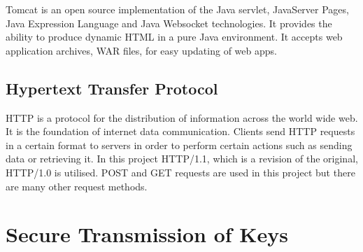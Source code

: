Tomcat is an open source implementation of the Java servlet, JavaServer Pages, Java Expression Language and Java Websocket technologies. It provides the ability to produce dynamic HTML in a pure Java environment. It accepts web application archives, WAR files,  for easy updating of web apps.

\subsection{Hypertext Transfer Protocol}

HTTP is a protocol for the distribution of information across the world wide web. It is the foundation of internet data communication. Clients send HTTP requests in a certain format to servers in order to perform certain actions such as sending data or retrieving it. In this project HTTP/1.1, which is a revision of the original, HTTP/1.0 is utilised. POST and GET requests are used in this project but there are many other request methods.

\section{Secure Transmission of Keys}
\label{keydist}


